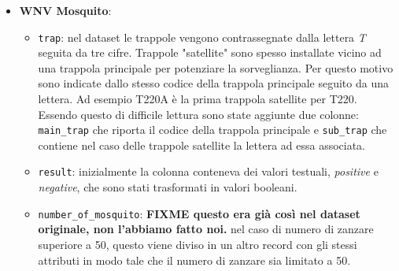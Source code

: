 \begin{itemize}
\begin{itemize}
            \item \texttt{stn\_pressure}, \texttt{sea\_level}: i valori di 
                pressione sono stati convertiti da pollici di mercurio (inHg) a 
                millimetri di mercurio (mmHg).

            \item \texttt{result\_speed}, \texttt{avg\_speed}, \texttt{max5\_speed}, 
            	\texttt{max2\_speed}: i valori di velocità sono stati convertiti da
            	miglia orarie (mph) a chilometri orari 
            	(\si[per-mode=symbol]{\km\per\hour}).
            
            \item \texttt{code\_sum}: questo attributo corrisponde ad una lista di 
            	codici che possono essere assegnati a ciascuna rilevazione, 
            	corrispondenti ai diversi tipi di precipitazioni e altri fenomeni
            	meteorologici (ad es. pioggia, neve, nebbia, \dots). Dato che a 
            	ciascuna rilevazione può essere assegnato più di un codice, è stato
            	necessario effettuare un parsing dei valori, creando una colonna per
            	ogni codice utilizzato.
        \end{itemize}
	
	\item \textbf{WNV Mosquito}:
	
	\begin{itemize}
		
		\item \texttt{trap}: nel dataset le trappole vengono contrassegnate 
		dalla lettera \textit{T} seguita da tre cifre. Trappole "satellite" 
		sono spesso installate vicino ad una trappola principale per potenziare 
		la sorveglianza. Per questo motivo sono indicate dallo stesso codice 
		della trappola principale seguito da una lettera. Ad esempio T220A è la 
		prima trappola satellite per T220. Essendo questo di difficile lettura 
		sono state aggiunte due colonne: \texttt{main\_trap} che riporta il 
		codice della trappola principale e \texttt{sub\_trap} che contiene nel 
		caso delle trappole satellite la lettera ad essa associata.
		
		\item \texttt{result}: inizialmente la colonna conteneva dei valori  
		testuali, \textit{positive} e \textit{negative}, che sono stati 
		trasformati in valori booleani.  
		
		\item \texttt{number\_of\_mosquito}: \textbf{FIXME questo era già così 
		nel dataset originale, non l'abbiamo fatto noi.} nel caso di numero di 
		zanzare superiore a 50, questo viene diviso in un altro record con gli 
		stessi attributi in modo tale che il numero di zanzare sia limitato a 
		50.  
			
	\end{itemize}
	
\end{itemize}

